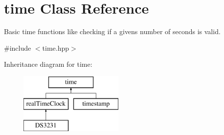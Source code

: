 \hypertarget{classtime}{}\section{time Class Reference}
\label{classtime}


Basic time functions like checking if a givens number of seconds is valid.  




{\ttfamily \#include $<$time.\+hpp$>$}

Inheritance diagram for time\+:\begin{figure}[H]
\begin{center}
\leavevmode
\includegraphics[height=3.000000cm]{classtime}
\end{center}
\end{figure}
